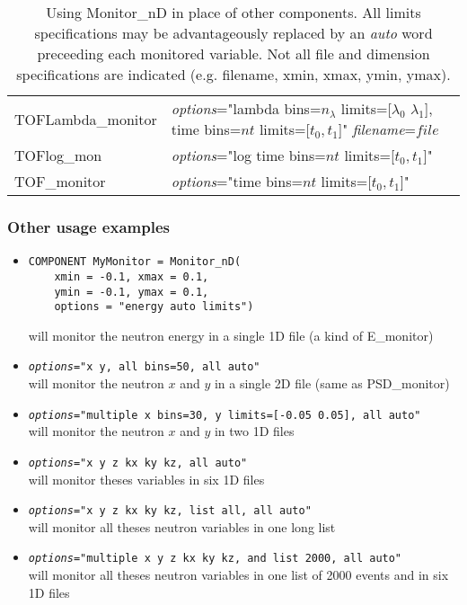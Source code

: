 \begin{table}
\begin{center}
{\begin{tabular}{|p{}|p{}|}
TOFLambda\_monitor  & {\it options}="lambda bins=$n_\lambda$ limits=[$\lambda_0$ $\lambda_1$], time bins=$nt$ limits=[$t_0, t_1$]" {\it filename}=$file$\\
TOFlog\_mon         & {\it options}="log time bins=$nt$ limits=[$t_0, t_1$]" \\
TOF\_monitor        & {\it options}="time bins=$nt$ limits=[$t_0, t_1$]" \\
\hline
    \end{tabular}
    \caption{Using Monitor\_nD in place of other components. All limits specifications may be advantageously replaced by an {\it auto} word preceeding each monitored variable. Not all file and dimension specifications are indicated (e.g. filename, xmin, xmax, ymin, ymax).}
    \label{t:monitor-nd-equiv}
    }
  \end{center}
\end{table}

\subsubsection{Other usage examples}

\begin{itemize}
\item{
\begin{verbatim}
COMPONENT MyMonitor = Monitor_nD(
    xmin = -0.1, xmax = 0.1,
    ymin = -0.1, ymax = 0.1,
    options = "energy auto limits")
\end{verbatim}
will monitor the neutron energy in a single 1D file (a kind of E\_monitor)}
\item{\texttt{{\it options}="x y, all bins=50, all auto"} \\
will monitor the neutron $x$ and $y$ in a single 2D file (same as PSD\_monitor)}

\item{\texttt{{\it options}="multiple x bins=30, y limits=[-0.05 0.05], all auto"} \\
will monitor the neutron $x$ and $y$ in two 1D files}
\item{\texttt{{\it options}="x y z kx ky kz, all auto"} \\
will monitor theses variables in six 1D files}
\item{\texttt{{\it options}="x y z kx ky kz, list all, all auto"} \\
will monitor all theses neutron variables in one long list}
\item{\texttt{{\it options}="multiple x y z kx ky kz, and list 2000, all auto"} \\
    will monitor all theses neutron variables in one list of 2000 events
    and in six 1D files}
\end{itemize}

